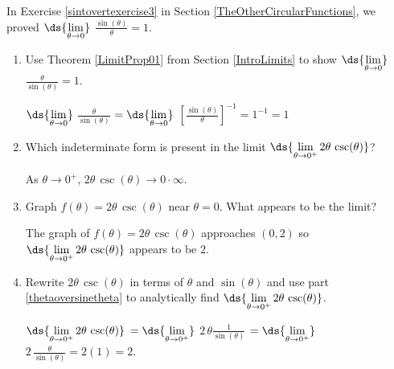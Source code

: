 \documentclass{ximera}
\begin{document}
\begin{problem}

In Exercise \ref{sintovertexercise3} in Section \ref{TheOtherCircularFunctions}, we proved $\ds{\lim_{\theta \rightarrow 0}}$ $\frac{\sin(\theta)}{\theta} = 1$.

\begin{enumerate}
\setcounter{enumi}{\value{HW}}

\item \label{thetaoversinetheta} Use Theorem \ref{LimitProp01} from Section \ref{IntroLimits} to show  $\ds{\lim_{\theta \rightarrow 0}}$ $\frac{\theta}{\sin(\theta)} = 1$.

\begin{solution}
    $\ds{\lim_{\theta \rightarrow 0}}$ $\frac{\theta}{\sin(\theta)}$ $ = \ds{\lim_{\theta \rightarrow 0}}$ $\left[\frac{\sin(\theta)}{\theta}\right]^{-1} = 1^{-1} = 1$
\end{solution}
\smallskip


\item  Which indeterminate form is present in the limit $\ds{\lim_{\theta \rightarrow 0^{+}} 2 \theta \, \csc(\theta)}$?

\begin{solution}
    As $\theta \rightarrow 0^{+}$, $2 \theta \, \csc(\theta) \rightarrow 0 \cdot \infty$.
\end{solution}

\smallskip

\item  Graph $f(\theta) = 2 \theta \, \csc(\theta)$ near $\theta = 0$.  What appears to be the limit?

\begin{solution}
    The graph of  $f(\theta) = 2 \theta \, \csc(\theta)$ approaches $(0,2)$ so  $\ds{\lim_{\theta \rightarrow 0^{+}} 2 \theta \, \csc(\theta)}$ appears to be $2$.
\end{solution}

\smallskip

\item  Rewrite $2 \theta \, \csc(\theta)$ in terms of $\theta$ and $\sin(\theta)$ and use part \ref{thetaoversinetheta} to analytically find $\ds{\lim_{\theta \rightarrow 0^{+}} 2 \theta \, \csc(\theta)}$.

\begin{solution}
     $\ds{\lim_{\theta \rightarrow 0^{+}} 2 \theta \, \csc(\theta)}$ $= \ds{\lim_{\theta \rightarrow 0^{+}}}$ $2 \, \theta \frac{1}{\sin(\theta)}$ $= \ds{\lim_{\theta \rightarrow 0^{+}}}$ $2 \, \frac{\theta}{\sin(\theta)} = 2(1) = 2$.
\end{solution}


\end{enumerate}
\end{problem}
\end{document}
